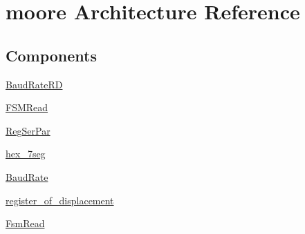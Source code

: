 \hypertarget{class_r_s232_read_1_1moore}{}\section{moore Architecture Reference}
\label{class_r_s232_read_1_1moore}
\subsection*{Components}
 \begin{DoxyCompactItemize}
\item 
\hyperlink{class_r_s232_read_1_1moore_a8c00d31ed1517acd6dc5539fb9313b42}{Baud\+Rate\+R\+D}  {\bfseries }  
\item 
\hyperlink{class_r_s232_read_1_1moore_ad213d6581df2e4055fe4bca5bf212097}{F\+S\+M\+Read}  {\bfseries }  
\item 
\hyperlink{class_r_s232_read_1_1moore_a102d5b27d1784f5a7cfa9495ae7a6a0a}{Reg\+Ser\+Par}  {\bfseries }  
\item 
\hyperlink{class_r_s232_read_1_1moore_a8d209a1fddaff24c09ffe8e8a9e214ae}{hex\+\_\+7seg}  {\bfseries }  
\item 
\hyperlink{class_r_s232_read_1_1moore_a7654bd82719bfde1c792d7828664dde2}{Baud\+Rate}  {\bfseries }  
\item 
\hyperlink{class_r_s232_read_1_1moore_abe596609c641d14c184c4e1bbdf2a703}{register\+\_\+of\+\_\+displacement}  {\bfseries }  
\item 
\hyperlink{class_r_s232_read_1_1moore_ab0f14bca27e77a487a2d337ec328ff97}{Fsm\+Read}  {\bfseries }  
\end{DoxyCompactItemize}
